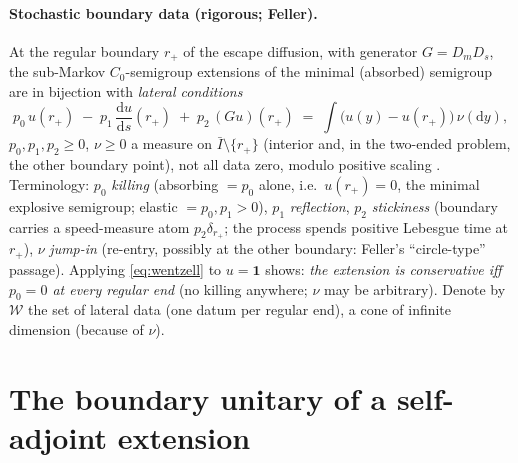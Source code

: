 \documentclass[11pt]{article}
\theoremstyle{remark}
\newcommand{\dd}{\mathrm{d}}
\begin{document}
\paragraph{Stochastic boundary data (rigorous; Feller).}
At the regular boundary $r_+$ of the escape diffusion, with generator
$G=D_mD_s$, the sub-Markov $C_0$-semigroup extensions of the minimal
(absorbed) semigroup are in bijection with \emph{lateral conditions}
\begin{equation}
p_0\,u(r_+)\;-\;p_1\,\frac{\dd u}{\dd s}(r_+)\;+\;p_2\,(Gu)(r_+)
\;=\;\int \bigl(u(y)-u(r_+)\bigr)\,\nu(\dd y),
\label{eq:wentzell}
\end{equation}
$p_0,p_1,p_2\ge0$, $\nu\ge0$ a measure on $\bar I\setminus\{r_+\}$
(interior and, in the two-ended problem, the other boundary point),
not all data zero, modulo positive scaling
\cite{Feller1952,Feller1957,ItoMcKean}.  Terminology: $p_0$
\emph{killing} (absorbing $=p_0$ alone, i.e.\ $u(r_+)=0$, the minimal
explosive semigroup; elastic $=p_0,p_1>0$), $p_1$ \emph{reflection},
$p_2$ \emph{stickiness} (boundary carries a speed-measure atom
$p_2\delta_{r_+}$; the process spends positive Lebesgue time at
$r_+$), $\nu$ \emph{jump-in} (re-entry, possibly at the other
boundary: Feller's ``circle-type'' passage).  Applying
\eqref{eq:wentzell} to $u=\mathbf 1$ shows: \emph{the extension is
conservative iff $p_0=0$ at every regular end} (no killing anywhere;
$\nu$ may be arbitrary).  Denote by $\mathcal W$ the set of lateral
data (one datum per regular end), a cone of infinite dimension
(because of $\nu$).

\section{The boundary unitary of a self-adjoint extension}
\end{document}
